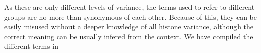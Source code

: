   As these are only different levels of variance, the terms used to refer to
  different groups are no more than synonymous of each other. Because of this,
  they can be easily misused without a deeper knowledge of all histone variance,
  although the correct meaning can be usually infered from the context. We
  have compiled the different terms in 


